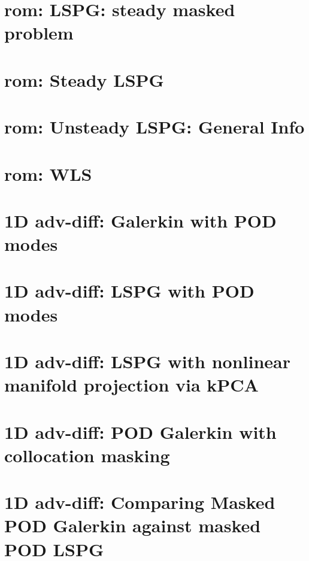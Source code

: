\let\mypdfximage\pdfximage\def\pdfximage{\immediate\mypdfximage}\documentclass[twoside]{book}
\newcommand{\+}{\discretionary{\mbox{\scriptsize$\hookleftarrow$}}{}{}}
\begin{document}
\chapter{rom\+: LSPG\+: steady masked problem}
\label{md_pages_components_rom_lspg_masked_steady}

\chapter{rom\+: Steady LSPG}
\label{md_pages_components_rom_lspg_steady}

\chapter{rom\+: Unsteady LSPG\+: General Info}
\label{md_pages_components_rom_lspg_unsteady}

\chapter{rom\+: WLS}
\label{md_pages_components_rom_wls}

\chapter{1D adv-\/diff\+: Galerkin with POD modes}
\label{md_pages_demos_demo1}

\chapter{1D adv-\/diff\+: LSPG with POD modes}
\label{md_pages_demos_demo2}

\chapter{1D adv-\/diff\+: LSPG with nonlinear manifold projection via k\+PCA}
\label{md_pages_demos_demo3}

\chapter{1D adv-\/diff\+: POD Galerkin with collocation masking}
\label{md_pages_demos_demo4}

\chapter{1D adv-\/diff\+: Comparing Masked POD Galerkin against masked POD LSPG}
\label{md_pages_demos_demo5}

\end{document}
